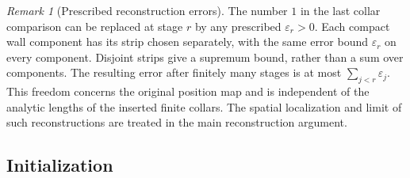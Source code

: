 \documentclass[11pt]{article}
\numberwithin{equation}{section}
\theoremstyle{definition}
\theoremstyle{remark}
\newtheorem{remark}[theorem]{Remark}
\begin{document}
\begin{remark}[Prescribed reconstruction errors]\label{packet:small-displacement}
The number $1$ in the last collar comparison can be replaced at stage
$r$ by any prescribed $\varepsilon_r>0$.  Each compact wall component
has its strip chosen separately, with the same error bound
$\varepsilon_r$ on every component.  Disjoint strips give a supremum
bound, rather than a sum over components.  The resulting error after
finitely many stages is at most $\sum_{j<r}\varepsilon_j$.
This freedom concerns the original position map and is independent
of the analytic lengths of the inserted finite collars.  The spatial
localization and limit of such reconstructions are treated in the
main reconstruction argument.
\end{remark}

\subsection{Initialization}
\end{document}
